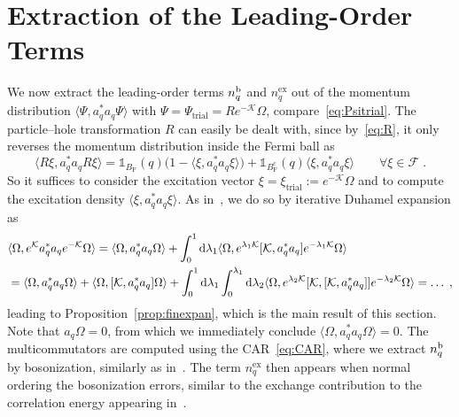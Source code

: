\documentclass[12pt,a4paper]{article}
\numberwithin{equation}{section}
\newcommand{\cF}{\mathcal{F}}
\newcommand{\cK}{\mathcal{K}}
\newcommand{\1}{\mathbb{I}}
\renewcommand{\b}{\textnormal{b}}
\newcommand{\di}{\textnormal{d}}
\newcommand{\ex}{\mathrm{ex}}
\newcommand{\F}{\mathrm{F}}
\newcommand{\trial}{\mathrm{trial}}
\theoremstyle{plain}
\theoremstyle{definition}
\theoremstyle{remark}
\theoremstyle{plain}
\theoremstyle{definition}
\theoremstyle{remark}
\begin{document}






\section{Extraction of the Leading-Order Terms}\label{sec:extraction}



We now extract the leading-order terms $ n_q^{\b} $ and $ n_q^{\ex} $ out of the momentum distribution $ \langle \Psi, a_q^* a_q \Psi \rangle $ with $ \Psi = \Psi_{\trial} = R e^{-\cK} \Omega $, compare~\eqref{eq:Psitrial}. The particle--hole transformation $ R $ can easily be dealt with, since by~\eqref{eq:R}, it only reverses the momentum distribution inside the Fermi ball as
\begin{equation} \label{eq:momentum_dist_R_trafo}
	\langle R \xi, a_q^* a_q R \xi \rangle
	= \mathds{1}_{B_{\F}}(q) \big( 1 - \langle \xi, a_q^* a_q \xi \rangle \big)
		+ \mathds{1}_{B_{\F}^c}(q) \langle \xi, a_q^* a_q \xi \rangle \qquad
		\forall \xi \in \cF \;.
\end{equation}
So it suffices to consider the excitation vector $ \xi = \xi_{\trial} := e^{-\cK} \Omega $ and to compute the excitation density $ \langle \xi, a_q^* a_q \xi \rangle $. As in~\cite{BL25}, we do so by iterative Duhamel expansion as
\begin{equation} \label{eq:duhamelexpansion_blueprint}
\begin{aligned}
	&\langle \Omega, e^{\cK} a_q^* a_q e^{-\cK} \Omega \rangle
	= \langle \Omega, a_q^* a_q \Omega \rangle
		+ \int_0^1 \di \lambda_1 \langle \Omega, e^{\lambda_1 \cK} [\cK, a_q^* a_q] e^{-\lambda_1 \cK} \Omega \rangle \\
	&= \langle \Omega, a_q^* a_q \Omega \rangle
		+ \langle \Omega, [\cK, a_q^* a_q] \Omega \rangle
		+ \int_0^1 \di \lambda_1 \int_0^{\lambda_1} \di \lambda_2 \langle \Omega, e^{\lambda_2 \cK} [\cK,[\cK, a_q^* a_q]] e^{-\lambda_2 \cK} \Omega \rangle
	= \ldots \;,
\end{aligned}
\end{equation}
leading to Proposition~\ref{prop:finexpan}, which is the main result of this section. Note that $ a_q \Omega = 0 $, from which we immediately conclude $ \langle \Omega, a_q^* a_q \Omega \rangle = 0 $. The multicommutators are computed using the CAR~\eqref{eq:CAR}, where we extract $ n_q^{\b} $ by bosonization, similarly as in~\cite{BL25}. The term $ n_q^{\ex} $ then appears when normal ordering the bosonization errors, similar to the exchange contribution to the correlation energy appearing in~\cite{CHN23}.
\end{document}
